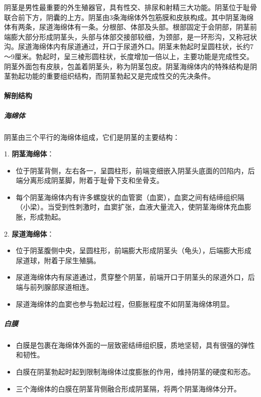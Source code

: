 阴茎是男性最重要的外生殖器官，具有性交、排尿和射精三大功能。阴茎位于耻骨联合前下方，阴囊的上方。阴茎由3条海绵体外包筋膜和皮肤构成。其中阴茎海绵体有两条，尿道海绵体有一条。分根部、体部及头部。根部固定于会阴部，阴茎前端膨大部分形成阴茎头，头部与体部交接部较细，为颈部，是一环形沟，又称冠状沟。尿道海绵体内有尿道通过，开口于尿道外口。阴茎未勃起时呈圆柱状，长约7～9厘米。勃起时，呈三棱形圆柱状，长度增加一倍以上，主要功能是完成性交。阴茎外面包有皮肤，包盖着阴茎头，称为阴茎包皮。阴茎海绵体内的特殊结构是阴茎勃起功能的重要组织结构，而阴茎勃起又是完成性交的先决条件。

\paragraph{解剖结构}

\subparagraph{海绵体}
阴茎由三个平行的海绵体组成，它们是阴茎的主要结构：

1. \textbf{阴茎海绵体}：
  \begin{itemize}
  \item 位于阴茎背侧，左右各一，呈圆柱形，前端变细嵌入阴茎头底面的凹陷内，后端分离形成阴茎脚，附着于耻骨下支和坐骨支。
  \item 每个阴茎海绵体内有许多螺旋状的血管窦（血窦），血窦之间有结缔组织隔（小梁）。当受到性刺激时，血窦扩张，血液大量流入，使阴茎海绵体充血膨胀，形成勃起。
  \end{itemize}

2. \textbf{尿道海绵体}：
  \begin{itemize}
  \item 位于阴茎腹侧中央，呈圆柱形，前端膨大形成阴茎头（龟头），后端膨大形成尿道球，附着于尿生殖膈。
  \item 尿道海绵体内有尿道通过，贯穿整个阴茎，前端开口于阴茎头的尿道外口，后端与前列腺部尿道相连。
  \item 尿道海绵体的血窦也参与勃起过程，但膨胀程度不如阴茎海绵体明显。
  \end{itemize}

\subparagraph{白膜}
\begin{itemize}
\item 白膜是包裹在海绵体外面的一层致密结缔组织膜，质地坚韧，具有很强的弹性和韧性。
\item 白膜在阴茎勃起时起到限制海绵体过度膨胀的作用，维持阴茎的硬度和形态。
\item 三个海绵体的白膜在阴茎背侧融合形成阴茎隔，将两个阴茎海绵体分开。
\end{itemize}


